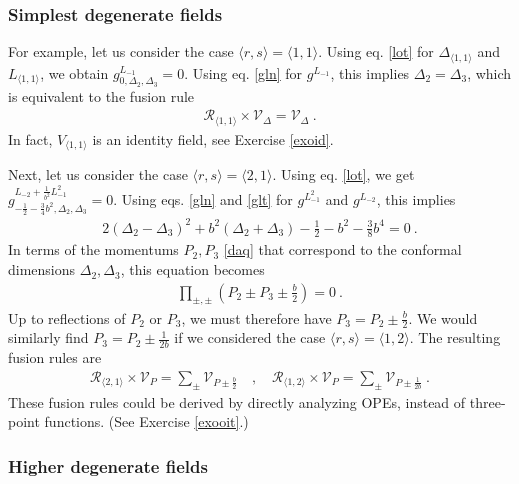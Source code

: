 \documentclass[12pt, a4paper, notitlepage, twoside]{report}
\numberwithin{equation}{section}
\theoremstyle{break}
\begin{document}
\subsubsection{Simplest degenerate fields}

For example, let us consider the case $\langle r,s \rangle = \langle 1,1 \rangle$.
Using eq. \eqref{lot} for $\Delta_{\langle 1,1 \rangle}$ and $L_{\langle 1,1 \rangle}$, we obtain
$g^{L_{-1}}_{0,\Delta_2,\Delta_3} = 0$.
Using eq. \eqref{gln} for $g^{L_{-1}}$, this implies 
$
 \Delta_2=\Delta_3
$,
which is equivalent to the fusion rule
\begin{align}
 \boxed{\mathcal{R}_{\langle 1,1\rangle} \times \mathcal{V}_\Delta = \mathcal{V}_\Delta} \ .
 \label{roof}
\end{align}
In fact, $V_{\langle 1,1\rangle}$ is an identity field, see Exercise \ref{exoid}.

Next, let us consider the case $\langle r,s \rangle = \langle 2,1 \rangle$.
Using eq. \eqref{lot}, we get
$g^{L_{-2} +\frac{1}{b^2} L_{-1}^2 }_{-\frac12 -\frac34 b^2,\Delta_2,\Delta_3} = 0$.
Using eqs. \eqref{gln} and \eqref{glt} for $g^{L_{-1}^2}$ and $g^{L_{-2}}$, this implies
\begin{align}
 2(\Delta_2-\Delta_3)^2 + b^2 (\Delta_2+\Delta_3) - \frac12 - b^2 -\frac38 b^4= 0\ .
\end{align}
In terms of the momentums $P_2,P_3$ \eqref{daq} that correspond to the conformal dimensions $\Delta_2,\Delta_3$, this equation becomes
\begin{align}
\prod_{\pm,\pm} \left(P_2\pm P_3 \pm \frac{b}{2}\right) = 0 \ .
\end{align}
Up to reflections of $P_2$ or $P_3$, we must therefore have
$
 P_3 = P_2 \pm \frac{b}{2}
$.
We would similarly find $P_3 = P_2 \pm \frac{1}{2b}$ if we considered the case $\langle r,s\rangle = \langle 1,2\rangle$. 
The resulting fusion rules are 
\begin{align}
\boxed{ \mathcal{R}_{\langle 2,1 \rangle}\times \mathcal{V}_P = \sum_\pm \mathcal{V}_{P \pm \frac{b}{2}} }\quad , \quad 
\boxed{ \mathcal{R}_{\langle 1,2 \rangle}\times \mathcal{V}_P = \sum_\pm \mathcal{V}_{P \pm \frac{1}{2b}} }\ .
\label{rot}
\end{align}
These fusion rules could be derived by directly analyzing OPEs, instead of three-point functions. (See Exercise \ref{exooit}.) 

\subsubsection{Higher degenerate fields}
\end{document}
